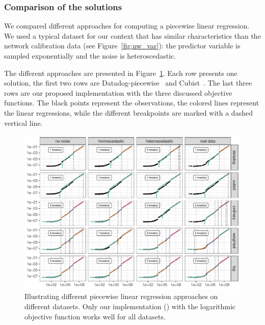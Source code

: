             \subsubsection{Comparison of the solutions}%

                We compared different approaches for computing a piecewise linear regression. We used a typical dataset
                for our context that has similar characteristics than the network calibration data (see
                Figure~\ref{fig:nw_var}): the predictor variable is sampled exponentially and the noise is
                heteroscedastic.

                The different approaches are presented in Figure~\ref{fig:prediction:pycewise}. Each row presents one
                solution, the first two rows are Datadog-piecewise~\cite{datadog} and Cubist~\cite{cubist}. The last
                three rows are our proposed implementation with the three discussed objective functions. The black
                points represent the observations, the colored lines represent the linear regressions, while the
                different breakpoints are marked with a dashed vertical line.

                \begin{figure}[htpb]
                    \centering
                    \includegraphics[width=\linewidth]{img/prediction/modeling/network/pycewise.pdf}
                    \caption{Illustrating different piecewise linear regression approaches on different datasets. Only
                    our implementation (\pyce) with the logarithmic objective function works well for all datasets.}%
                    \label{fig:prediction:pycewise}
                \end{figure}

